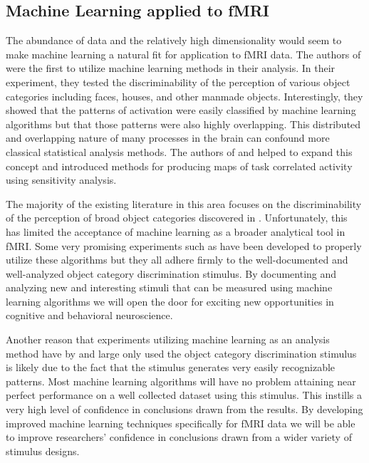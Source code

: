 \documentclass[12pt]{article}
\begin{document}
\subsection{Machine Learning applied to fMRI}
The abundance of data and the relatively high dimensionality would seem to make machine learning a natural fit for application to fMRI data.
The authors of \cite{Haxby2001} were the first to utilize machine learning methods in their analysis.
In their experiment, they tested the discriminability of the perception of various object categories including faces, houses, and other manmade objects.
Interestingly, they showed that the patterns of activation were easily classified by machine learning algorithms but that those patterns were also highly overlapping.
This distributed and overlapping nature of many processes in the brain can confound more classical statistical analysis methods.
The authors of \cite{Mitchell2003} and \cite{Haynes2006} helped to expand this concept and introduced methods for producing maps of task correlated activity using sensitivity analysis.

The majority of the existing literature in this area focuses on the discriminability of the perception of broad object categories discovered in \cite{Haxby2001}.
Unfortunately, this has limited the acceptance of machine learning as a broader analytical tool in fMRI.
Some very promising experiments such as \cite{Lewis-Peacock2012} have been developed to properly utilize these algorithms but they all adhere firmly to the well-documented and well-analyzed object category discrimination stimulus.
By documenting and analyzing new and interesting stimuli that can be measured using machine learning algorithms we will open the door for exciting new opportunities in cognitive and behavioral neuroscience.

Another reason that experiments utilizing machine learning as an analysis method have by and large only used the object category discrimination stimulus is likely due to the fact that the stimulus generates very easily recognizable patterns.
Most machine learning algorithms will have no problem attaining near perfect performance on a well collected dataset using this stimulus.
This instills a very high level of confidence in conclusions drawn from the results.
By developing improved machine learning techniques specifically for fMRI data we will be able to improve researchers' confidence in conclusions drawn from a wider variety of stimulus designs.
\end{document}
